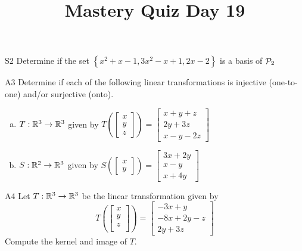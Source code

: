 \documentclass{sbgLAquiz}
\title{Mastery Quiz Day 19 }
\begin{document}
\begin{problem}{S2}
Determine if the set $\left\{ x^2+x-1, 3x^2-x+1, 2x-2 \right\}$ is a basis of $\P_2$
\end{problem}

\begin{problem}{A3}
Determine if each of the following linear transformations is injective (one-to-one) and/or surjective (onto).
\begin{enumerate}[(a)]
\item $T: \IR^3 \rightarrow \IR^3$ given by $T\left(\begin{bmatrix} x \\ y \\ z  \end{bmatrix} \right) = \begin{bmatrix} x+y+z \\ 2y+3z \\ x-y-2z \end{bmatrix} $
\item $S: \IR^2 \rightarrow \IR^3$ given by $S\left(\begin{bmatrix} x \\ y  \end{bmatrix} \right) = \begin{bmatrix} 3x+2y \\ x-y \\ x+4y \end{bmatrix} $
\end{enumerate}
\end{problem}
\newpage

\begin{problem}{A4}
Let $T: \IR^3\rightarrow \IR^3$ be the linear transformation given by $$T\left(\begin{bmatrix} x \\ y \\ z \\  \end{bmatrix} \right) = \begin{bmatrix} -3x+y \\ -8x+2y-z \\ 2y+3z \end{bmatrix}$$
Compute the kernel and image of $T$.
\end{problem}
\end{document}
